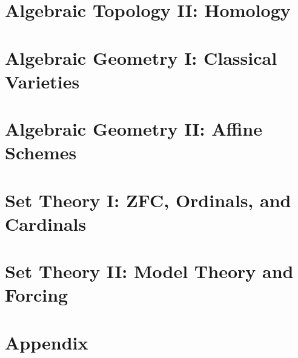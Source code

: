 \documentclass[11pt,twoside=semi,openright,numbers=noenddot,titlepage=false]{scrbook}
\begin{document}
\part{Algebraic Topology II: Homology}
\label{part:algtop2}
\parttoc






\part{Algebraic Geometry I: Classical Varieties}
\label{part:ag1}
\parttoc





\part{Algebraic Geometry II: Affine Schemes}
\label{part:ag2}
\parttoc







\part{Set Theory I: ZFC, Ordinals, and Cardinals}
\label{part:st1}
\parttoc





\part{Set Theory II: Model Theory and Forcing}
\label{part:st2}
\parttoc




\part{Appendix}
\parttoc
\appendix







\backmatter

\clearpage
\printbibliography[type=image,title={Image Attributions}]
\printbibliography[nottype=image]
\end{document}
